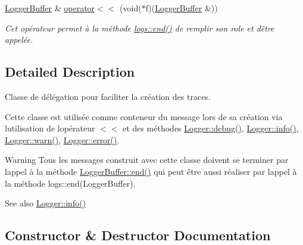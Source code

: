 \begin{DoxyCompactItemize}
\hyperlink{classlogs_1_1Logger_1_1LoggerBuffer}{Logger\+Buffer} \& \hyperlink{classlogs_1_1Logger_1_1LoggerBuffer_ad38b5bba9a701fbd0a2c9c97a9ecbbf9}{operator$<$$<$} (void($\ast$f)(\hyperlink{classlogs_1_1Logger_1_1LoggerBuffer}{Logger\+Buffer} \&))
\begin{DoxyCompactList}\small\item\em Cet opérateur permet à la méthode \hyperlink{Logger_8hpp_ac6f325c6cfe6189bc8e243daa184453b}{logs\+::end()} de remplir son role et d\textquotesingle{}être appelée. \end{DoxyCompactList}\end{DoxyCompactItemize}


\subsection{Detailed Description}
Classe de délégation pour faciliter la création des traces. 

Cette classe est utilisée comme conteneur du message lors de sa création via l\textquotesingle{}utilisation de l\textquotesingle{}opérateur $<$$<$ et des méthodes \hyperlink{classlogs_1_1Logger_a7dffc8f610014ec59b63392da16140e4}{Logger\+::debug()}, \hyperlink{classlogs_1_1Logger_aa381165771d00a6a1e3aa9664bf6467f}{Logger\+::info()}, \hyperlink{classlogs_1_1Logger_a240e8d7b58195c85bd7b4e4a3417d955}{Logger\+::warn()}, \hyperlink{classlogs_1_1Logger_a8b6a2019233bc44b3c3c86c653910831}{Logger\+::error()}.

\begin{DoxyWarning}{Warning}
Tous les messages construit avec cette classe doivent se terminer par l\textquotesingle{}appel à la méthode \hyperlink{classlogs_1_1Logger_1_1LoggerBuffer_a0e4fd77693fd899ec1b0670354f93a02}{Logger\+Buffer\+::end()} qui peut être aussi réaliser par l\textquotesingle{}appel à la méthode logs\+::end(\+Logger\+Buffer).
\end{DoxyWarning}
\begin{DoxySeeAlso}{See also}
\hyperlink{classlogs_1_1Logger_aa381165771d00a6a1e3aa9664bf6467f}{Logger\+::info()} 
\end{DoxySeeAlso}


\subsection{Constructor \& Destructor Documentation}
\mbox{\label{classlogs_1_1Logger_1_1LoggerBuffer_af0693b3b740e8d5c8d09bea5ef0c8695}} 
